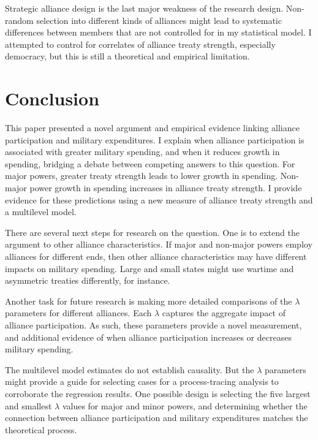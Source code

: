 \documentclass[12pt]{article}
\begin{document}
Strategic alliance design is the last major weakness of the research design. 
Non-random selection into different kinds of alliances might lead to systematic differences between members that are not controlled for in my statistical model. 
I attempted to control for correlates of alliance treaty strength, especially democracy, but this is still a theoretical and empirical limitation. 



\section{Conclusion}


This paper presented a novel argument and empirical evidence linking alliance participation and military expenditures. 
I explain when alliance participation is associated with greater military spending, and when it reduces growth in spending, bridging a debate between competing answers to this question. 
For major powers, greater treaty strength leads to lower growth in spending. 
Non-major power growth in spending increases in alliance treaty strength. 
I provide evidence for these predictions using a new measure of alliance treaty strength and a multilevel model. 


There are several next steps for research on the question. 
One is to extend the argument to other alliance characteristics. 
If major and non-major powers employ alliances for different ends, then other alliance characteristics may have different impacts on military spending. 
Large and small states might use wartime and asymmetric treaties differently, for instance. 


Another task for future research is making more detailed comparisons of the $\lambda$ parameters for different alliances. 
Each $\lambda$ captures the aggregate impact of alliance participation.
As such, these parameters provide a novel measurement, and additional evidence of when alliance participation increases or decreases military spending. 


The multilevel model estimates do not establish causality. 
But the $\lambda$ parameters might provide a guide for selecting cases for a process-tracing analysis to corroborate the regression results.
One possible design is selecting the five largest and smallest $\lambda$ values for major and minor powers, and determining whether the connection between alliance participation and military expenditures matches the theoretical process.
\end{document}

